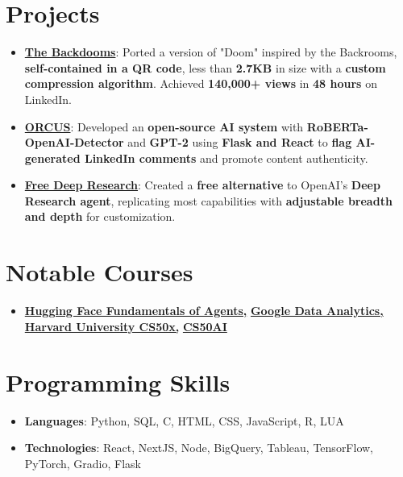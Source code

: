 \documentclass[letterpaper,10.8pt]{article}
\newcommand{\resumeItem}[2]{
  \item\small{
    \textbf{#1}{: #2 \vspace{-2pt}}
  }
}
\newcommand{\resumeSubHeadingListStart}{\begin{itemize}[leftmargin=*]}
\newcommand{\resumeSubHeadingListEnd}{\end{itemize}}
\begin{document}
\section*{Projects}
\resumeSubHeadingListStart
  \resumeItem{\href{https://github.com/Kuberwastaken/backdooms}{The Backdooms}}{Ported a version of "Doom" inspired by the Backrooms, \textbf{self-contained in a QR code}, less than \textbf{2.7KB} in size with a \textbf{custom compression algorithm}. Achieved \textbf{140,000+ views} in \textbf{48 hours} on LinkedIn.}
  \vspace{5pt}
  \resumeItem{\href{https://github.com/Kuberwastaken/ORCUS}{ORCUS}}{Developed an \textbf{open-source AI system} with \textbf{RoBERTa-OpenAI-Detector} and \textbf{GPT-2} using \textbf{Flask and React} to \textbf{flag AI-generated LinkedIn comments} and promote content authenticity.}
  \vspace{5pt}
  \resumeItem{\href{https://github.com/Kuberwastaken/free-deep-research}{Free Deep Research}}{Created a \textbf{free alternative} to OpenAI's \textbf{Deep Research agent}, replicating most capabilities with \textbf{adjustable breadth and depth} for customization.}
\resumeSubHeadingListEnd

\section*{Notable Courses}
\resumeSubHeadingListStart
  \item \textbf{\href{https://cdn-uploads.huggingface.co/production/uploads/noauth/iD2BAETFKpkiYBWPVz1fn.webp}{Hugging Face Fundamentals of Agents,}} \textbf{\href{https://www.coursera.org/account/accomplishments/specialization/AS9JOBALFZSL}{Google Data Analytics,}} \textbf{\href{https://certificates.cs50.io/fe4b0a5a-c586-4a15-91ec-6b8a65f829e4.pdf?size=letter}{Harvard University CS50x,}}
  \textbf{\href{https://certificates.cs50.io/025b42e2-4fe7-4095-a3d8-0f2ef49e7b1c.pdf?size=letter}{CS50AI}}
\resumeSubHeadingListEnd

\section*{Programming Skills}
\resumeSubHeadingListStart
  \item{
    \textbf{Languages}{: Python, SQL, C, HTML, CSS, JavaScript, R, LUA}
  }
  \item{
    \textbf{Technologies}{: React, NextJS, Node, BigQuery, Tableau, TensorFlow, PyTorch, Gradio, Flask}
  }
\resumeSubHeadingListEnd
\end{document}
